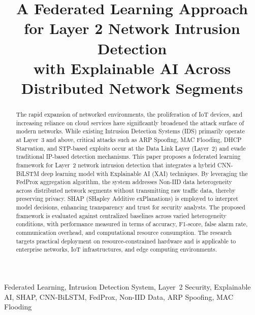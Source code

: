 \documentclass[conference]{IEEEtran}
\begin{document}
\title{A Federated Learning Approach for Layer 2 Network Intrusion Detection\\
with Explainable AI Across Distributed Network Segments}

\author{
}

\maketitle

\begin{abstract}
The rapid expansion of networked environments, the proliferation of IoT devices, and
increasing reliance on cloud services have significantly broadened the attack surface of
modern networks. While existing Intrusion Detection Systems (IDS) primarily operate at
Layer~3 and above, critical attacks such as ARP Spoofing, MAC Flooding, DHCP Starvation,
and STP-based exploits occur at the Data Link Layer (Layer~2) and evade traditional
IP-based detection mechanisms. This paper proposes a federated learning framework for
Layer~2 network intrusion detection that integrates a hybrid CNN-BiLSTM deep learning
model with Explainable AI (XAI) techniques. By leveraging the FedProx aggregation
algorithm, the system addresses Non-IID data heterogeneity across distributed network
segments without transmitting raw traffic data, thereby preserving privacy. SHAP
(SHapley Additive exPlanations) is employed to interpret model decisions, enhancing
transparency and trust for security analysts. The proposed framework is evaluated against
centralized baselines across varied heterogeneity conditions, with performance measured
in terms of accuracy, F1-score, false alarm rate, communication overhead, and
computational resource consumption. The research targets practical deployment on
resource-constrained hardware and is applicable to enterprise networks, IoT
infrastructures, and edge computing environments.
\end{abstract}

\begin{IEEEkeywords}
Federated Learning, Intrusion Detection System, Layer~2 Security, Explainable AI,
SHAP, CNN-BiLSTM, FedProx, Non-IID Data, ARP Spoofing, MAC Flooding
\end{IEEEkeywords}
\end{document}
